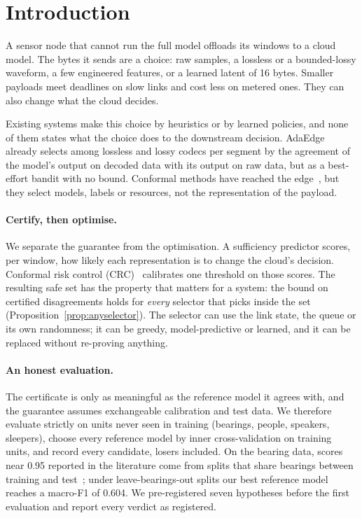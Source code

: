\section{Introduction}
\label{sec:intro}

A sensor node that cannot run the full model offloads its windows to a cloud model. The bytes it
sends are a choice: raw samples, a lossless or a bounded-lossy waveform, a few engineered
features, or a learned latent of 16 bytes. Smaller payloads meet deadlines on slow links and cost
less on metered ones. They can also change what the cloud decides.

Existing systems make this choice by heuristics or by learned policies, and none of them states
what the choice does to the downstream decision. AdaEdge~\cite{liu2024adaedge} already selects
among lossless and lossy codecs per segment by the agreement of the model's output on decoded data
with its output on raw data, but as a best-effort bandit with no bound. Conformal methods have
reached the edge~\cite{kalor2025blackbox,huang2025cascades,zhu2024cdcrc}, but they select models,
labels or resources, not the representation of the payload.

\paragraph{Certify, then optimise.} We separate the guarantee from the optimisation. A
sufficiency predictor scores, per window, how likely each representation is to change the cloud's
decision. Conformal risk control (CRC)~\cite{angelopoulos2024crc} calibrates one threshold on those
scores. The resulting safe set has the property that matters for a system: the bound on
certified disagreements holds for \emph{every} selector that picks inside the set
(Proposition~\ref{prop:anyselector}). The selector can use the link state, the queue or its own
randomness; it can be greedy, model-predictive or learned, and it can be replaced without
re-proving anything.

\paragraph{An honest evaluation.} The certificate is only as meaningful as the reference model it
agrees with, and the guarantee assumes exchangeable calibration and test data. We therefore
evaluate strictly on units never seen in training (bearings, people, speakers, sleepers), choose
every reference model by inner cross-validation on training units, and record every
candidate, losers included. On the bearing data, scores near 0.95 reported in the literature come
from splits that share bearings between training and test~\cite{realistic2026bearing}; under
leave-bearings-out splits our best reference model reaches a macro-F1 of 0.604. We pre-registered
seven hypotheses before the first evaluation and report every verdict as registered.

